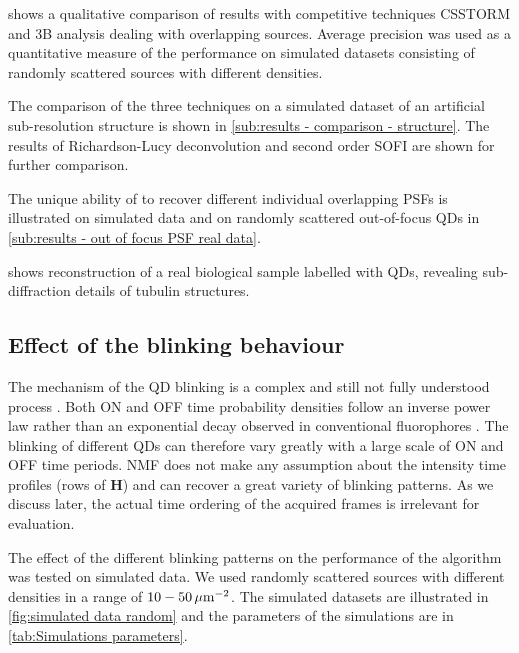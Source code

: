  shows a qualitative comparison of \inmf{} results with competitive techniques CSSTORM and 3B analysis dealing with overlapping sources. Average precision was used as a quantitative measure of the performance on simulated datasets consisting of randomly scattered sources with different densities.

The comparison of the three techniques on a simulated dataset of an artificial sub-resolution structure is shown in \autoref{sub:results - comparison - structure}. The results of Richardson-Lucy deconvolution and second order SOFI are shown for further comparison. 

The unique ability of \inmf{} to recover different individual overlapping PSFs is illustrated on simulated data and on randomly scattered out-of-focus QDs in \autoref{sub:results - out of focus PSF real data}.

 shows \inmf{} reconstruction of a real biological sample labelled with QDs, revealing sub-diffraction details of tubulin structures.


\subsection{Effect of the blinking behaviour \label{sub:results - blinking behaviour}}
The mechanism of the QD blinking is a complex and still not fully understood process \cite{Stefani2009}. Both ON and OFF time probability densities follow an inverse power law rather than an exponential decay observed in conventional fluorophores \cite{Kuno2001}. The blinking of different QDs can therefore vary greatly with a large scale of ON and OFF time periods. NMF does not make any assumption about the intensity time profiles (rows of $\bm{H}$) and can recover a great variety of blinking patterns. As we discuss later, the actual time ordering of the acquired frames is irrelevant for \inmf{} evaluation. 

The effect of the different blinking patterns on the performance of the \inmf{} algorithm was tested on simulated data. We used randomly scattered sources with different densities in a range of $10-50\, \mathrm{\mu m}^{-2}$. The simulated datasets are illustrated in \autoref{fig:simulated data random} and the parameters of the simulations are in \autoref{tab:Simulations parameters}. 

